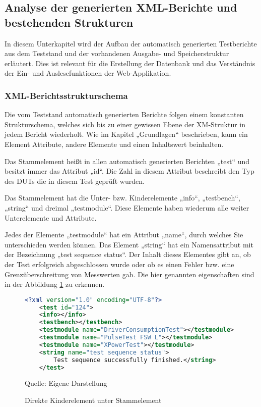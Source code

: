 \subsection{Analyse der generierten XML-Berichte und bestehenden Strukturen}
\label{subsec:analyse-der-generierten-xml-berichte-und-bestehenden-strukturen}

In diesem Unterkapitel wird der Aufbau der automatisch
generierten Testberichte aus dem Teststand und der vorhandenen Ausgabe- und Speicherstruktur
erläutert. Dies ist relevant für die Erstellung der Datenbank und das
Verständnis der Ein- und Auslesefunktionen der Web-Applikation.

\subsubsection{XML-Berichtsstrukturschema}

Die vom Teststand automatisch generierten
Berichte folgen einem konstanten Strukturschema, welches sich bis zu einer
gewissen Ebene der XM-Struktur in jedem Bericht wiederholt. Wie im Kapitel „Grundlagen“
beschrieben, kann ein Element Attribute, andere Elemente und einen Inhaltswert beinhalten.

Das Stammelement heißt in allen automatisch
generierten Berichten „test“ und besitzt immer das Attribut „id“. Die Zahl in
diesem Attribut beschreibt den Typ des \ac{DUTs} die in diesem Test geprüft wurden.

Das Stammelement hat die Unter- bzw.
Kinderelemente „info“, „testbench“, „string“ und dreimal „testmodule“. Diese
Elemente haben wiederum alle weiter Unterelemente und Attribute.

Jedes der Elemente „testmodule“ hat ein Attribut
„name“, durch welches Sie unterschieden werden können. Das Element „string“ hat
ein Namensattribut mit der Bezeichnung „test sequence status“. Der Inhalt
dieses Elementes gibt an, ob der Test erfolgreich abgeschlossen wurde oder ob
es einen Fehler bzw. eine Grenzüberschreitung von Messwerten gab.
Die hier genannten eigenschaften sind in der Abbildung \ref{fig: Direkte Kinderelement unter Stammelement} zu erkennen.

\begin{figure}[H]
\centering
\begin{minipage}{0.95\textwidth}
\begin{lstlisting}[language=XML]
<?xml version="1.0" encoding="UTF-8"?>
    <test id="124">
    <info></info>
    <testbench></testbench>
    <testmodule name="DriverConsumptionTest"></testmodule>
    <testmodule name="PulseTest FSW L"></testmodule>
    <testmodule name="XPowerTest"></testmodule>
    <string name="test sequence status">
        Test sequence successfully finished.</string>
    </test>
\end{lstlisting}
\end{minipage}
\caption{Direkte Kinderelement unter Stammelement}
\label{fig: Direkte Kinderelement unter Stammelement}
    {Quelle: Eigene Darstellung}
\end{figure}


